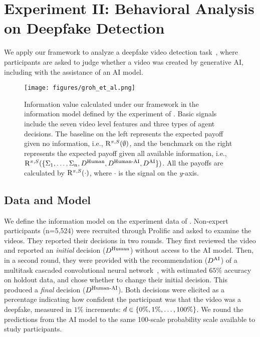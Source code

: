 
 \mvspace{-2mm}
\section{Experiment II: Behavioral Analysis on Deepfake Detection}
\label{exp1}
 \mvspace{-2mm}
We apply our framework to analyze a deepfake video detection task~\citep{dolhansky2020deepfake}, where participants are asked to judge whether a video was created by generative AI, including with the assistance of an AI model.

\begin{figure}
    \centering
    \texttt{[image: figures/groh\_et\_al.png]}
    \mvspace{-7mm}
    \caption{Information value calculated under our framework in the information model defined by the experiment of \citet{groh2022deepfake}. Basic signals include the seven video level features and three types of agent decisions. The baseline on the left represents the expected payoff given no information, i.e., $\mathrm{R}^{\pi, S}(\emptyset)$, and the benchmark on the right represents the expected payoff given all available information, i.e., $\mathrm{R}^{\pi, S}(\{\Sigma_1,\ldots,\Sigma_n, D^{\text{Human}}, D^{\text{Human-AI}}, D^{\text{AI}}\})$. All the payoffs are calculated by $\mathrm{R}^{\pi, S}(\cdot)$, where $\cdot$ is the signal on the \textit{y}-axis.
    }
    \mvspace{-6mm}
    \label{fig:analysis_groh}
\end{figure}
 \mvspace{-2mm}
\subsection{Data and Model}
  \mvspace{-2mm}
We define the information model on the experiment data of \citet{groh2022deepfake}. 
Non-expert participants (n=5,524) were recruited through Prolific and asked to examine the videos. 
They reported their decisions in two rounds.
They first reviewed the video and reported an \textit{initial} decision ($D^{\text{Human}}$) without access to the AI model. Then, in a second round, they were provided with the recommendation ($D^{\text{AI}}$) of a multitask cascaded convolutional neural network~\citep{zhang2016joint}, with estimated $65\%$ accuracy on holdout data, and chose whether to change their initial decision. 
This produced a \textit{final} decision ($D^{\text{Human-AI}}$).
Both decisions were elicited as a percentage indicating how confident the participant was that the video was a deepfake, measured in $1\%$ increments: $d \in \{0\%, 1\%, \ldots, 100\%\}$.
We round the predictions from the AI model to the same 100-scale probability scale available to study participants.

